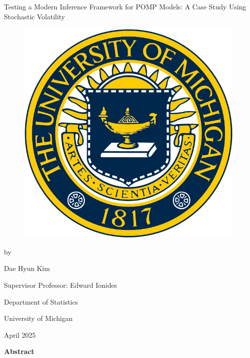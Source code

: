 \documentclass[11pt]{report}
\begin{document}
\newpage 
\begin{center}
\huge Testing a Modern Inference Framework for POMP Models: A Case Study Using Stochastic Volatility  
\par\vspace{1cm} %
\begin{figure}[ht]
\begin{center}
\includegraphics[width=.4\textwidth]{umichlogo.png}
\end{center}
\end{figure}
{\fontsize{16pt}{16pt}\selectfont by \par Dae Hyun Kim \par} %
\vspace{1.0cm}
\par\vspace{0.2cm}
{\fontsize{16pt}{18pt}\selectfont Supervisor Professor: Edward Ionides \par} 
\vspace{0.7cm}
\vspace{10pt}
{\fontsize{16pt}{16pt}\selectfont Department of Statistics \par }  %
\vspace{1.5cm}
{\fontsize{18pt}{18pt} University of Michigan\par} 
\vspace{1cm}
{\fontsize{14pt}{14pt}\selectfont April 2025}
\end{center}

\newpage 
{} %
\begin{center}
\par\vspace{20pt}
\large \textbf{Abstract}
\end{center}
\end{document}
